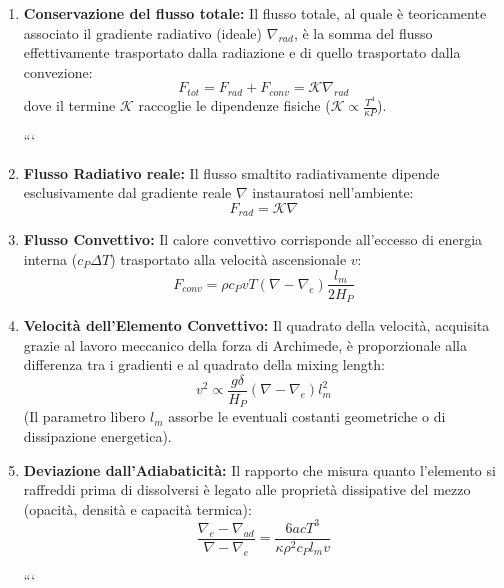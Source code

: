 \begin{enumerate}
\item \textbf{Conservazione del flusso totale:} Il flusso totale, al quale è teoricamente associato il gradiente radiativo (ideale) $\nabla_{rad}$, è la somma del flusso effettivamente trasportato dalla radiazione e di quello trasportato dalla convezione:
\begin{equation}
F_{tot} = F_{rad} + F_{conv} = \mathcal{K} \nabla_{rad}
\end{equation}
dove il termine $\mathcal{K}$ raccoglie le dipendenze fisiche ($\mathcal{K} \propto \frac{T^4}{\kappa P}$).

```
\item \textbf{Flusso Radiativo reale:} Il flusso smaltito radiativamente dipende esclusivamente dal gradiente reale $\nabla$ instauratosi nell'ambiente:
\begin{equation}
    F_{rad} = \mathcal{K} \nabla
\end{equation}

\item \textbf{Flusso Convettivo:} Il calore convettivo corrisponde all'eccesso di energia interna ($c_P \Delta T$) trasportato alla velocità ascensionale $v$:
\begin{equation}
    F_{conv} = \rho c_P v T (\nabla - \nabla_e) \frac{l_m}{2 H_P}
\end{equation}

\item \textbf{Velocità dell'Elemento Convettivo:} Il quadrato della velocità, acquisita grazie al lavoro meccanico della forza di Archimede, è proporzionale alla differenza tra i gradienti e al quadrato della mixing length:
\begin{equation}
    v^2 \propto \frac{g \delta}{H_P} (\nabla - \nabla_e) l_m^2
\end{equation}
(Il parametro libero $l_m$ assorbe le eventuali costanti geometriche o di dissipazione energetica).

\item \textbf{Deviazione dall'Adiabaticità:} Il rapporto che misura quanto l'elemento si raffreddi prima di dissolversi è legato alle proprietà dissipative del mezzo (opacità, densità e capacità termica):
\begin{equation}
    \frac{\nabla_e - \nabla_{ad}}{\nabla - \nabla_e} = \frac{6 a c T^3}{\kappa \rho^2 c_P l_m v}
\end{equation}

```

\end{enumerate}

